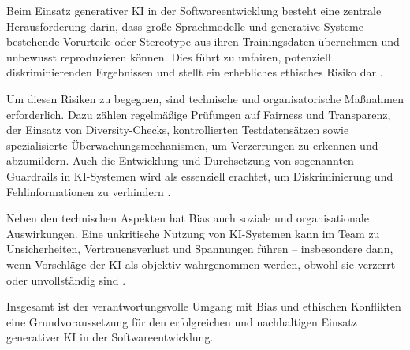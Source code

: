 
Beim Einsatz generativer KI in der Softwareentwicklung besteht eine zentrale
Herausforderung darin, dass große Sprachmodelle und generative Systeme
bestehende Vorurteile oder Stereotype aus ihren Trainingsdaten übernehmen und
unbewusst reproduzieren können. Dies führt zu unfairen, potenziell
diskriminierenden Ergebnissen und stellt ein erhebliches ethisches Risiko dar
\cite{weisz_design_2024}.

Um diesen Risiken zu begegnen, sind technische und organisatorische Maßnahmen
erforderlich. Dazu zählen regelmäßige Prüfungen auf Fairness und Transparenz,
der Einsatz von Diversity-Checks, kontrollierten Testdatensätzen sowie
spezialisierte Überwachungsmechanismen, um Verzerrungen zu erkennen und
abzumildern. Auch die Entwicklung und Durchsetzung von sogenannten Guardrails
in KI-Systemen wird als essenziell erachtet, um Diskriminierung und
Fehlinformationen zu verhindern \cite{weisz_design_2024,
    schmitt_generative_2024}.

Neben den technischen Aspekten hat Bias auch soziale und organisationale
Auswirkungen. Eine unkritische Nutzung von KI-Systemen kann im Team zu
Unsicherheiten, Vertrauensverlust und Spannungen führen – insbesondere dann,
wenn Vorschläge der KI als objektiv wahrgenommen werden, obwohl sie verzerrt
oder unvollständig sind \cite{schmitt_generative_2024}.

Insgesamt ist der verantwortungsvolle Umgang mit Bias und ethischen Konflikten
eine Grundvoraussetzung für den erfolgreichen und nachhaltigen Einsatz
generativer KI in der Softwareentwicklung.
